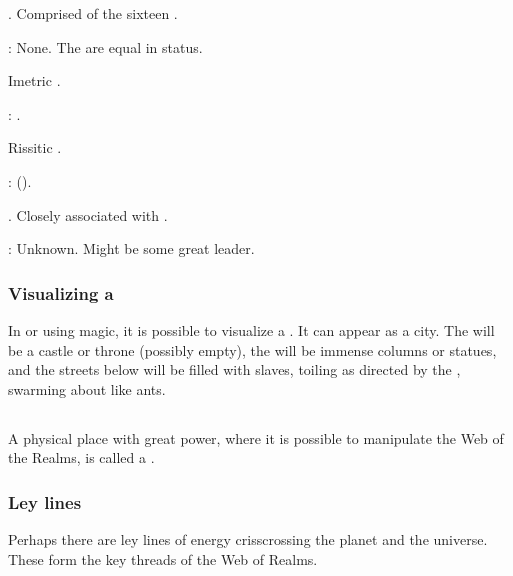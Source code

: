 \begin{gloss}
  
  
    \Iquinian{} \nexus.
    Comprised of the sixteen \sephiroth. 
    
    \Apex: 
    None. The \sephiroth{} are equal in status. 
  
    Imetric \nexus. 
    
    \Apex: 
    \Sarokash. 
  
    Rissitic \nexus. 
    
    \Apex: 
    \HriistN{} (\Secherdamon). 
  
    \Vorcanth{} \nexus.
    Closely associated with . 
    
    \Apex: 
    Unknown. 
    Might be some great \vorcanth{} leader. 
\end{gloss}





\subsubsection{Visualizing a \nexus}
In  or using magic, it is possible to visualize a \nexus{}. It can appear as a city. The \apex{} will be a castle or throne (possibly empty), the \vertices{} will be immense columns or statues, and the streets below will be filled with slaves, toiling as directed by the \vertices, swarming about like ants. 










\subsection{\Nexus}
\index{\nexus}
A physical place with great power, where it is possible to manipulate the Web of the Realms, is called a \nexus. 





\subsubsection{Ley lines}
Perhaps there are ley lines of \nexus{} energy crisscrossing the planet and the universe. These form the key threads of the Web of Realms. 

